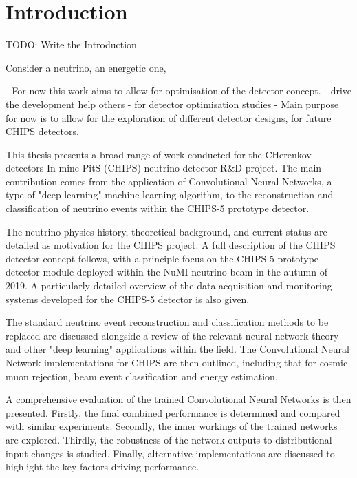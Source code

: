 \chapter{Introduction} %
\label{chap:introduction} %
\setcounter{page}{17}  %

TODO: Write the Introduction

Consider a neutrino, an energetic one,

- For now this work aims to allow for optimisation of the \chips detector concept.
- drive the development help others
- for detector optimisation studies
- Main purpose for now is to allow for the exploration of different detector designs, for future
CHIPS detectors.

This thesis presents a broad range of work conducted for the CHerenkov detectors In mine PitS
(CHIPS) neutrino detector R\&D project. The main contribution comes from the application of
Convolutional Neural Networks, a type of "deep learning" machine learning algorithm, to the
reconstruction and classification of neutrino events within the CHIPS-5 prototype detector.

The neutrino physics history, theoretical background, and current status are detailed as
motivation for the CHIPS project. A full description of the CHIPS detector concept follows, with a
principle focus on the CHIPS-5 prototype detector module deployed within the NuMI neutrino beam in
the autumn of 2019. A particularly detailed overview of the data acquisition and monitoring
systems developed for the CHIPS-5 detector is also given.

The standard neutrino event reconstruction and classification methods to be replaced are discussed
alongside a review of the relevant neural network theory and other "deep learning" applications
within the field. The Convolutional Neural Network implementations for CHIPS are then outlined,
including that for cosmic muon rejection, beam event classification and energy estimation.

A comprehensive evaluation of the trained Convolutional Neural Networks is then presented.
Firstly, the final combined performance is determined and compared with similar experiments.
Secondly, the inner workings of the trained networks are explored. Thirdly, the robustness of the
network outputs to distributional input changes is studied. Finally, alternative implementations
are discussed to highlight the key factors driving performance.

